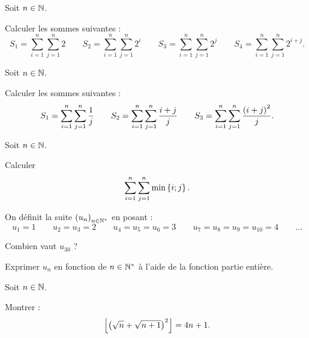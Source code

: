 \begin{corr}
\end{corr}

\begin{exo}
Soit \(n\in\mathbb{N}\).

Calculer les sommes suivantes : \[S_1=\sum_{i=1}^{n}\sum_{j=1}^{n}2\qquad S_2=\sum_{i=1}^{n}\sum_{j=1}^{n}2^i\qquad S_3=\sum_{i=1}^{n}\sum_{j=1}^{n}2^j\qquad S_4=\sum_{i=1}^{n}\sum_{j=1}^{n}2^{i+j}.\]
\end{exo}

\begin{corr}
\end{corr}

\begin{exo}
Soit \(n\in\mathbb{N}\).

Calculer les sommes suivantes : \[S_1=\sum_{i=1}^{n}\sum_{j=1}^{n}\dfrac{1}{j}\qquad S_2=\sum_{i=1}^{n}\sum_{j=1}^{n}\dfrac{i+j}{j}\qquad S_3=\sum_{i=1}^{n}\sum_{j=1}^{n}\dfrac{\left(i+j\right)^2}{j}.\]
\end{exo}

\begin{corr}
\end{corr}

\begin{exo}
Soit \(n\in\mathbb{N}\).

Calculer \[\sum_{i=1}^{n}\sum_{j=1}^{n}\min\left\lbrace i;j\right\rbrace.\]
\end{exo}

\begin{corr}
\end{corr}

\begin{exo}
On définit la suite \(\left(u_n\right)_{n\in\mathbb{N}^*}\) en posant : \[u_1=1\qquad u_2=u_3=2\qquad u_4=u_5=u_6=3\qquad u_7=u_8=u_9=u_{10}=4\qquad \dots\]

Combien vaut \(u_{30}\) ?

Exprimer \(u_n\) en fonction de \(n\in\mathbb{N}^*\) à l'aide de la fonction partie entière.
\end{exo}

\begin{corr}
\end{corr}

\begin{exo}
Soit \(n\in\mathbb{N}\).

Montrer : \[\left\lfloor\left(\sqrt{n}+\sqrt{n+1}\right)^2\right\rfloor=4n+1.\]
\end{exo}

\begin{corr}
\end{corr}

